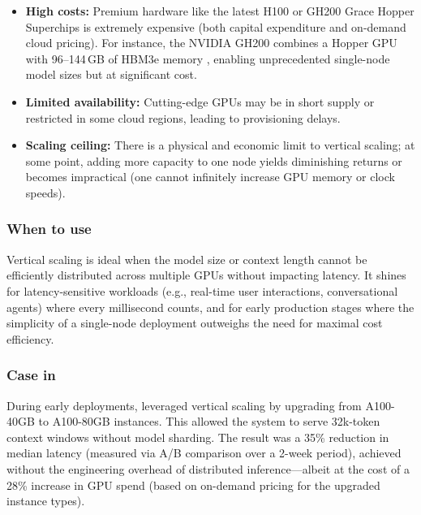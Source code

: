 \begin{tcolorbox}[
  title={\textbf{Vertical Scaling: Cons}},
  colback=red!5,
  colframe=red!40!black,
  colbacktitle=red!20,
  coltitle=black,
  fonttitle=\bfseries,
  boxrule=0.7pt,
  arc=4pt,
  left=5mm, right=5mm, top=4mm, bottom=4mm,
  before skip=6pt,
  after skip=6pt
]
\begin{itemize}[leftmargin=1.5em, itemsep=3pt]
    \item \textbf{High costs:} Premium hardware like the latest H100 or GH200 Grace Hopper Superchips is extremely expensive (both capital expenditure and on-demand cloud pricing). For instance, the NVIDIA GH200 combines a Hopper GPU with 96--144\,GB of HBM3e memory \cite{supermicro.com}, enabling unprecedented single-node model sizes but at significant cost.
    \item \textbf{Limited availability:} Cutting-edge GPUs may be in short supply or restricted in some cloud regions, leading to provisioning delays.
    \item \textbf{Scaling ceiling:} There is a physical and economic limit to vertical scaling; at some point, adding more capacity to one node yields diminishing returns or becomes impractical (one cannot infinitely increase GPU memory or clock speeds).
\end{itemize}
\end{tcolorbox}

\subsubsection{When to use}
Vertical scaling is ideal when the model size or context length cannot be efficiently distributed across multiple GPUs without impacting latency. It shines for latency-sensitive workloads (e.g., real-time user interactions, conversational agents) where every millisecond counts, and for early production stages where the simplicity of a single-node deployment outweighs the need for maximal cost efficiency.

\subsubsection{Case in \ishtar{}}
During early deployments, \ishtar{} leveraged vertical scaling by upgrading from A100-40GB to A100-80GB instances. This allowed the system to serve 32k-token context windows without model sharding. The result was a 35\% reduction in median latency (measured via A/B comparison over a 2-week period), achieved without the engineering overhead of distributed inference---albeit at the cost of a 28\% increase in GPU spend (based on on-demand pricing for the upgraded instance types).

